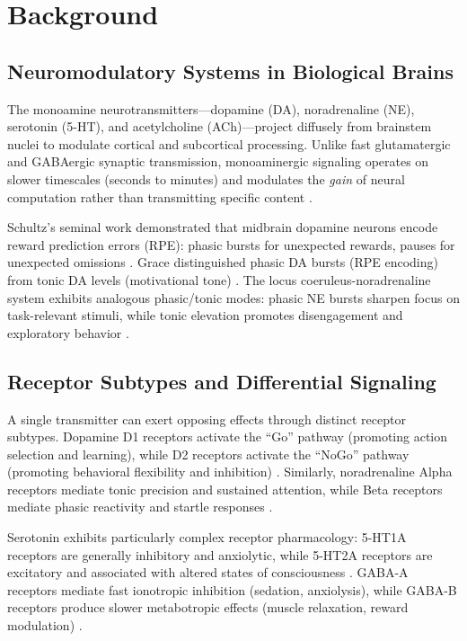 \documentclass[11pt,a4paper]{article}
\begin{document}
\section{Background}

\subsection{Neuromodulatory Systems in Biological Brains}

The monoamine neurotransmitters---dopamine (DA), noradrenaline (NE), serotonin (5-HT), and acetylcholine (ACh)---project diffusely from brainstem nuclei to modulate cortical and subcortical processing. Unlike fast glutamatergic and GABAergic synaptic transmission, monoaminergic signaling operates on slower timescales (seconds to minutes) and modulates the \emph{gain} of neural computation rather than transmitting specific content \citep{servan1999}.

Schultz's seminal work demonstrated that midbrain dopamine neurons encode reward prediction errors (RPE): phasic bursts for unexpected rewards, pauses for unexpected omissions \citep{schultz1997}. Grace distinguished phasic DA bursts (RPE encoding) from tonic DA levels (motivational tone) \citep{grace1991}. The locus coeruleus-noradrenaline system exhibits analogous phasic/tonic modes: phasic NE bursts sharpen focus on task-relevant stimuli, while tonic elevation promotes disengagement and exploratory behavior \citep{aston-jones2005}.

\subsection{Receptor Subtypes and Differential Signaling}

A single transmitter can exert opposing effects through distinct receptor subtypes. Dopamine D1 receptors activate the ``Go'' pathway (promoting action selection and learning), while D2 receptors activate the ``NoGo'' pathway (promoting behavioral flexibility and inhibition) \citep{frank2005}. Similarly, noradrenaline Alpha receptors mediate tonic precision and sustained attention, while Beta receptors mediate phasic reactivity and startle responses \citep{arnsten2000}.

Serotonin exhibits particularly complex receptor pharmacology: 5-HT1A receptors are generally inhibitory and anxiolytic, while 5-HT2A receptors are excitatory and associated with altered states of consciousness \citep{carhart-harris2017}. GABA-A receptors mediate fast ionotropic inhibition (sedation, anxiolysis), while GABA-B receptors produce slower metabotropic effects (muscle relaxation, reward modulation) \citep{mohler2006}.
\end{document}
